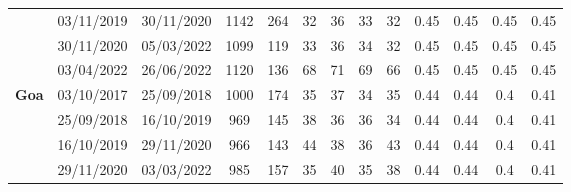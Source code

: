 \begin{table}[]
\begin{tabular}{|c|cc|cc|cccc|cccc|}
                                      & \multicolumn{1}{c|}{03/11/2019}          & 30/11/2020        & \multicolumn{1}{c|}{1142}           & 264           & \multicolumn{1}{c|}{32}     & \multicolumn{1}{c|}{36}     & \multicolumn{1}{c|}{33}     & 32     & \multicolumn{1}{c|}{0.45}   & \multicolumn{1}{c|}{0.45}   & \multicolumn{1}{c|}{0.45}   & 0.45   \\ \cline{2-13} 
                                      & \multicolumn{1}{c|}{30/11/2020}          & 05/03/2022        & \multicolumn{1}{c|}{1099}           & 119           & \multicolumn{1}{c|}{33}     & \multicolumn{1}{c|}{36}     & \multicolumn{1}{c|}{34}     & 32     & \multicolumn{1}{c|}{0.45}   & \multicolumn{1}{c|}{0.45}   & \multicolumn{1}{c|}{0.45}   & 0.45   \\ \cline{2-13} 
                                      & \multicolumn{1}{c|}{03/04/2022}          & 26/06/2022        & \multicolumn{1}{c|}{1120}           & 136           & \multicolumn{1}{c|}{68}     & \multicolumn{1}{c|}{71}     & \multicolumn{1}{c|}{69}     & 66     & \multicolumn{1}{c|}{0.45}   & \multicolumn{1}{c|}{0.45}   & \multicolumn{1}{c|}{0.45}   & 0.45   \\ \hline
\multirow{5}{*}{\textbf{Goa}}         & \multicolumn{1}{c|}{03/10/2017}          & 25/09/2018        & \multicolumn{1}{c|}{1000}           & 174           & \multicolumn{1}{c|}{35}     & \multicolumn{1}{c|}{37}     & \multicolumn{1}{c|}{34}     & 35     & \multicolumn{1}{c|}{0.44}   & \multicolumn{1}{c|}{0.44}   & \multicolumn{1}{c|}{0.4}    & 0.41   \\ \cline{2-13} 
                                      & \multicolumn{1}{c|}{25/09/2018}          & 16/10/2019        & \multicolumn{1}{c|}{969}            & 145           & \multicolumn{1}{c|}{38}     & \multicolumn{1}{c|}{36}     & \multicolumn{1}{c|}{36}     & 34     & \multicolumn{1}{c|}{0.44}   & \multicolumn{1}{c|}{0.44}   & \multicolumn{1}{c|}{0.4}    & 0.41   \\ \cline{2-13} 
                                      & \multicolumn{1}{c|}{16/10/2019}          & 29/11/2020        & \multicolumn{1}{c|}{966}            & 143           & \multicolumn{1}{c|}{44}     & \multicolumn{1}{c|}{38}     & \multicolumn{1}{c|}{36}     & 43     & \multicolumn{1}{c|}{0.44}   & \multicolumn{1}{c|}{0.44}   & \multicolumn{1}{c|}{0.4}    & 0.41   \\ \cline{2-13} 
                                      & \multicolumn{1}{c|}{29/11/2020}          & 03/03/2022        & \multicolumn{1}{c|}{985}            & 157           & \multicolumn{1}{c|}{35}     & \multicolumn{1}{c|}{40}     & \multicolumn{1}{c|}{35}     & 38     & \multicolumn{1}{c|}{0.44}   & \multicolumn{1}{c|}{0.44}   & \multicolumn{1}{c|}{0.4}    & 0.41   \\ \cline{2-13} 

\end{tabular}
\end{table}
